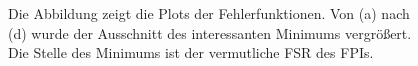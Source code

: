 \begin{figure}[H]
{{{		}
	}}
	\caption[FSR-Bestimmung]{Die Abbildung zeigt die Plots der Fehlerfunktionen.
	Von (a) nach (d) wurde der Ausschnitt des interessanten Minimums vergrößert. Die
	Stelle des Minimums ist der vermutliche FSR des FPIs.}
	\label{fig:nonius_FSR_messung}
\end{figure}

